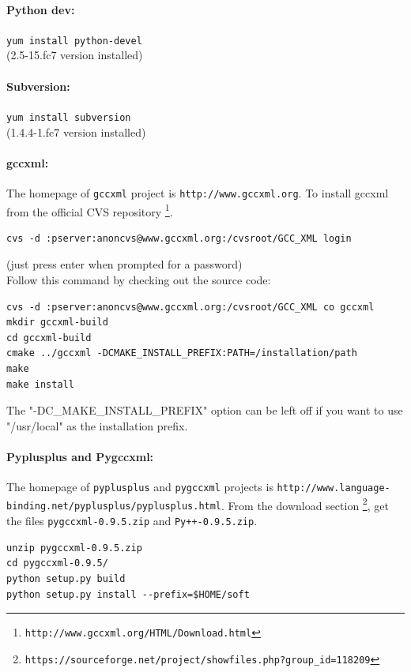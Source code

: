 \documentclass[12pt,a4paper]{article}
\begin{document}
\paragraph{Python dev:} {\tt yum install python-devel} \\
(2.5-15.fc7 version installed)

\paragraph{Subversion:} {\tt yum install subversion} \\
(1.4.4-1.fc7 version installed)

\paragraph{gccxml:}The homepage of {\tt gccxml} project is {\tt http://www.gccxml.org}. 
To install gccxml from the official CVS repository \footnote{\tt http://www.gccxml.org/HTML/Download.html}.

\begin{verbatim}
cvs -d :pserver:anoncvs@www.gccxml.org:/cvsroot/GCC_XML login
\end{verbatim}
(just press enter when prompted for a password)\\
Follow this command by checking out the source code:
\begin{verbatim}
cvs -d :pserver:anoncvs@www.gccxml.org:/cvsroot/GCC_XML co gccxml
mkdir gccxml-build
cd gccxml-build
cmake ../gccxml -DCMAKE_INSTALL_PREFIX:PATH=/installation/path
make
make install
\end{verbatim}
The "-DC\_MAKE\_INSTALL\_PREFIX" option can be left off if you want to use "/usr/local" as the installation prefix.


\paragraph{Pyplusplus and Pygccxml: }
The homepage of {\tt pyplusplus} and {\tt pygccxml} projects is 
{\tt http://www.language-binding.net/pyplusplus/pyplusplus.html}. From the
download section \footnote{\tt https://sourceforge.net/project/showfiles.php?group\_id=118209}, 
get the files {\tt pygccxml-0.9.5.zip} and {\tt Py++-0.9.5.zip}.

\begin{verbatim}
unzip pygccxml-0.9.5.zip
cd pygccxml-0.9.5/
python setup.py build
python setup.py install --prefix=$HOME/soft
\end{verbatim}
\end{document}
